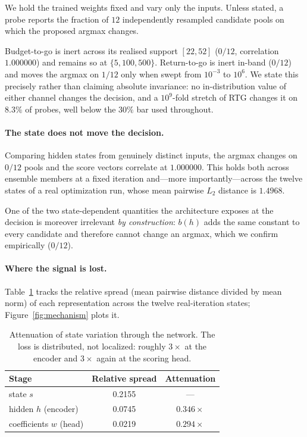 \documentclass[11pt]{article}
\begin{document}
We hold the trained weights fixed and vary only the inputs. Unless stated, a
probe reports the fraction of $12$ independently resampled candidate pools on
which the proposed argmax changes.

Budget-to-go is inert across its realised support $[22,52]$ ($0/12$, correlation
$1.000000$) and remains so at $\{5,100,500\}$. Return-to-go is inert in-band
($0/12$) and moves the argmax on $1/12$ only when swept from $10^{-3}$ to
$10^{6}$. We state this precisely rather than claiming absolute invariance: no
in-distribution value of either channel changes the decision, and a $10^{9}$-fold
stretch of RTG changes it on $8.3\%$ of probes, well below the $30\%$ bar used
throughout.

\paragraph{The state does not move the decision.} Comparing hidden states from
genuinely distinct inputs, the argmax changes on $0/12$ pools and the score
vectors correlate at $1.000000$. This holds both across ensemble members at a
fixed iteration and---more importantly---across the twelve states of a real
optimization run, whose mean pairwise $L_2$ distance is $1.4968$.

One of the two state-dependent quantities the architecture exposes at the
decision is moreover irrelevant \emph{by construction}: $b(h)$ adds the same
constant to every candidate and therefore cannot change an argmax, which we
confirm empirically ($0/12$).

\paragraph{Where the signal is lost.} Table~\ref{tab:atten} tracks the relative
spread (mean pairwise distance divided by mean norm) of each representation
across the twelve real-iteration states; Figure~\ref{fig:mechanism} plots it.

\begin{table}[t]\centering
\caption{Attenuation of state variation through the network. The loss is
distributed, not localized: roughly $3\times$ at the encoder and $3\times$ again
at the scoring head.}
\label{tab:atten}
\begin{tabular}{lcc}
\toprule
Stage & Relative spread & Attenuation \\
\midrule
state $s$            & 0.2155 & --- \\
hidden $h$ (encoder) & 0.0745 & $0.346\times$ \\
coefficients $w$ (head) & 0.0219 & $0.294\times$ \\
\bottomrule
\end{tabular}
\end{table}
\end{document}
